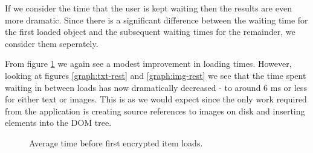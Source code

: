 If we consider the time that the user is kept waiting then the results are even more dramatic. Since there is a significant difference between the waiting time for the first loaded object and the subsequent waiting times for the remainder, we consider them seperately.

From figure \ref{graph:time-first} we again see a modest improvement in loading times. However, looking at figures \ref{graph:txt-rest} and \ref{graph:img-rest} we see that the time spent waiting in between loads has now dramatically decreased - to around 6 ms or less for either text or images. This is as we would expect since the only work required from the application is creating source references to images on disk and inserting elements into the DOM tree.

\begin{figure}[tbph]
    \begin{center}
    \caption{Average time before first encrypted item loads.}
    \label{graph:time-first}
  \end{center}
\end{figure}

